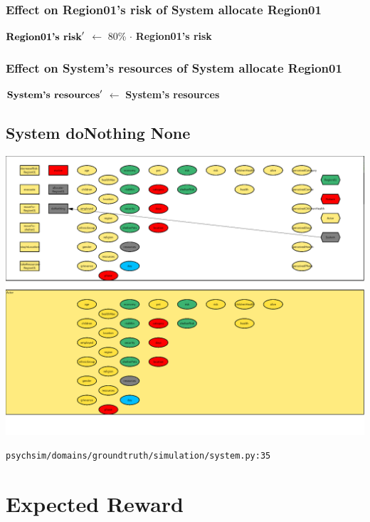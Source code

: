 \documentclass{article}%
\begin{document}
%
\subsubsection{Effect on Region01's risk of System allocate Region01}%
\label{ssubsec:Effect on Region01's risk of System allocate Region01}%
\begin{flushleft}%
$\mbox{\textbf{Region01's risk}} '$%
$\leftarrow$%
80\%%
$\cdot$%
\textbf{Region01's risk}%
\end{flushleft}

%
\subsubsection{Effect on System's resources of System allocate Region01}%
\label{ssubsec:Effect on System's resources of System allocate Region01}%
\begin{flushleft}%
$\mbox{\textbf{System's resources}} '$%
$\leftarrow$%
\textbf{System's resources}%
\end{flushleft}

%
\subsection{System doNothing None}%
\label{subsec:System doNothing None}%
\includegraphics[width=\textwidth]{images/System-doNothing.png}%
\begin{flushleft}%
\verb|psychsim/domains/groundtruth/simulation/system.py:35|%
\end{flushleft}

%
\section{Expected Reward}%
\label{sec:Expected Reward}%
\end{document}
